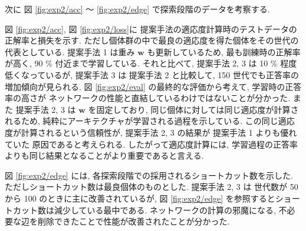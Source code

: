 次に 図 \ref{fig:exp2/acc} ～ \ref{fig:exp2/edge} で探索段階のデータを考察する.

図 \ref{fig:exp2/acc}, 図 \ref{fig:exp2/loss}に
提案手法の適応度計算時のテストデータの正解率と損失を示す.
ただし個体群の中で最良の適応度を得た個体をその世代の代表としている.
提案手法 1 は重み $\bm{w}$ も更新しているため, 最も訓練時の正解率が高く, 90 \% 付近まで学習している.
それと比べて, 提案手法 2, 3 は 10 \% 程度低くなっているが,
提案手法 3 は 提案手法 2 と比較して, 150 世代でも正答率の増加傾向が見られる.
図 \ref{fig:exp2/eval} の最終的な評価から考えて, 学習時の正答率の高さが
ネットワークの性能と直結しているわけではないことが分かった.
また 提案手法 2, 3 は $\bm{w}$ を固定しており, 同じ個体に対しては同じ適応度が計算されるため,
純粋にアーキテクチャが学習される過程を示している.
この同じ適応度が計算されるという信頼性が, 提案手法 2, 3 の結果が 提案手法 1 よりも優れていた
原因であると考えられる.
したがって適応度計算には, 学習過程の正答率よりも同じ結果となることがより重要であると言える.

図 \ref{fig:exp2/edge} には, 各探索段階での採用されるショートカット数を示した.
ただしショートカット数は最良個体のものとした.
提案手法 2, 3 は 世代数が 50 から 100 のときに主に改善されているが,
図 \ref{fig:exp2/edge} を参照するとショートカット数は減少している最中である.
ネットワークの計算の邪魔になる, 不必要な辺を削除できたことで性能が改善されたことが分かった.


